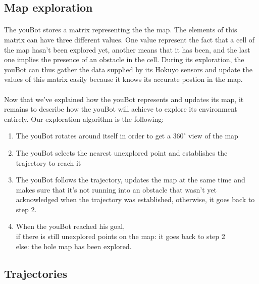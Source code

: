 \documentclass[12pt,a4paper]{article}
\begin{document}
\subsection{Map exploration}
\paragraph{}
The youBot stores a matrix representing the the map. The elements of this matrix can have three different values. One value represent the fact that a cell of the map hasn't been explored yet, another means that it has been, and the last one implies the presence of an obstacle in the cell. During its exploration, the youBot can thus gather the data supplied by its Hokuyo sensors and update the values of this matrix easily because it knows its accurate postion in the map.   

\paragraph{} 
Now that we've explained how the youBot represents and updates its map, it remains to describe how the youBot will achieve to explore its environment entirely. Our exploration algorithm is the following:

\begin{enumerate}
\item The youBot rotates around itself in order to get a $360^{\circ}$ view of the map

\item The youBot selects the nearest unexplored point and establishes the trajectory to reach it

\item The youBot follows the trajectory, updates the map at the same time and makes sure that it's not running into an obstacle that wasn't yet acknowledged when the trajectory was established, otherwise, it goes back to step 2.

\item When the youBot reached his goal, \\if there is still unexplored points on the map: it goes back to step 2 \\else: the hole map has been explored.

\end{enumerate}



\subsection{Trajectories}
\end{document}
